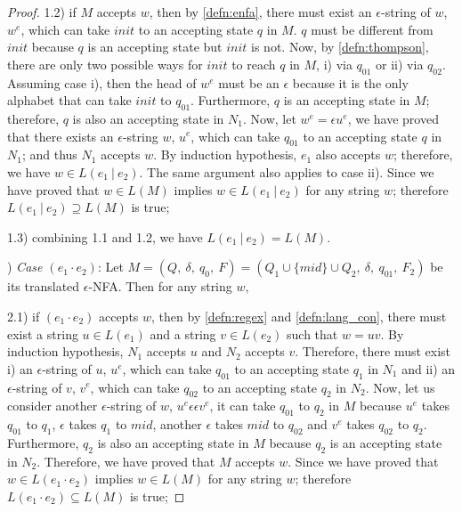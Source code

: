 \begin{proof}
\par 1.2) if \(M\) accepts \(w\), then by \autoref{defn:enfa}, there must exist an
\(\epsilon\)-string of \(w\), \(w^e\), which can take \(init\) to an
accepting state \(q\) in \(M\). \(q\) must be different from \(init\) because
\(q\) is an accepting state but \(init\) is not. Now, by
\autoref{defn:thompson}, there are only two possible ways for \(init\) to reach \(q\) in \(M\), i)
via \(q_{01}\) or ii) via \(q_{02}\). Assuming case i), then the head of \(w^e\)
must be an \(\epsilon\) because it is the only alphabet that can take
\(init\) to \(q_{01}\). Furthermore, \(q\) is an
accepting state in \(M\); therefore, \(q\) is also an accepting
state in \(N_1\). Now, let \(w^e = \epsilon u^e\), we have proved that
there exists an \(\epsilon\)-string \(w\), \(u^e\), which can take
\(q_{01}\) to an accepting state \(q\) in \(N_1\); and thus \(N_1\)
accepts \(w\). By induction hypothesis, \(e_1\) also accepts \(w\);
therefore, we have \(w \in L(e_1\ |\ e_2)\). The same argument also
applies to case ii). Since we have proved that \(w \in L(M)\) implies
\(w \in L(e_1\ |\ e_2)\) for any string \(w\); therefore \(L(e_1\ |\
e_2) \supseteq L(M)\) is true; 

\par 1.3) combining 1.1 and 1.2, we have \(L(e_1\ |\ e_2) = L(M)\). 

\par {}) \textit{Case \((e_1 \cdot e_2)\)}: Let \(M = (Q,\
\delta,\ q_0,\ F) = (Q_1 \cup \{mid\} \cup Q_2,\ \delta,\ q_{01},\
F_2)\) be its translated \(\epsilon\)-NFA. Then for any string
\(w\), 

\par 2.1) if \((e_1 \cdot e_2)\) accepts \(w\), then by
\autoref{defn:regex} and \autoref{defn:lang_con}, there must exist a string \(u \in L(e_1)\) and a string \(v \in L(e_2)\) such that \(w
= uv\). By induction hypothesis, \(N_1\) accepts \(u\) and \(N_2\)
accepts \(v\). Therefore, there must exist i) an \(\epsilon\)-string
of \(u\), \(u^e\), which can take \(q_{01}\) to an accepting state \(q_1\) in
\(N_1\) and ii) an \(\epsilon\)-string of \(v\), \(v^e\), which can take
\(q_{02}\) to an accepting state \(q_2\) in \(N_2\). Now, let us
consider another \(\epsilon\)-string of \(w\), \(u^e\epsilon \epsilon
v^e\), it can take \(q_{01}\) to \(q_2\) in \(M\) because \(u^e\) takes
\(q_{01}\) to \(q_1\), \(\epsilon\) takes \(q_1\) to \(mid\), another
\(\epsilon\) takes \(mid\) to \(q_{02}\) and \(v^e\) takes \(q_{02}\)
to \(q_2\). Furthermore, \(q_2\)
is also an accepting state in \(M\) because \(q_2\) is an accepting
state in \(N_2\). Therefore, we have proved that \(M\) accepts \(w\). 
Since we have proved that \(w \in L(e_1 \cdot e_2)\) implies 
\(w \in L(M)\) for any string \(w\); therefore \(L(e_1 \cdot e_2) \subseteq L(M)\) is true; 


\end{proof}
